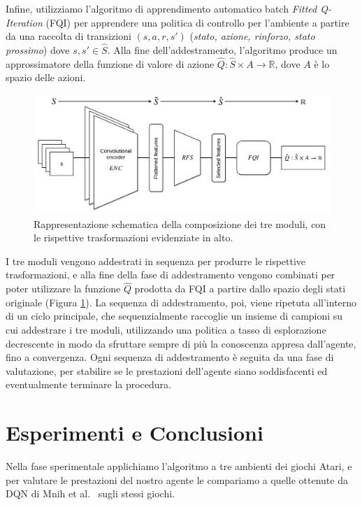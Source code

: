 Infine, utilizziamo l'algoritmo di apprendimento automatico batch 
\textit{Fitted Q-Iteration} (FQI) \cite{ernst2005tree} per apprendere una 
politica  di controllo per l'ambiente a partire da una raccolta di transizioni 
$(s, a, r, s')$ (\textit{stato, azione, rinforzo, stato prossimo}) dove 
$s, s' \in \hat{S}$. Alla fine dell'addestramento, l'algoritmo produce un 
approssimatore della funzione di valore di azione $\hat{Q}: \hat{S} \times A \rightarrow \mathbb{R}$, 
dove $A$ \`e lo spazio delle azioni. 
%
\begin{figure}
    \includegraphics[width=\textwidth]{pictures/full_pipeline}
    \centering
    \caption[Rappresentazione dei tre moduli principali]{Rappresentazione
	    schematica della composizione dei tre moduli, con le rispettive
	    trasformazioni evidenziate in alto.}
    \label{f:abs_full}
\end{figure}
%

I tre moduli vengono addestrati in sequenza per produrre le rispettive 
trasformazioni, e alla fine della fase di addestramento vengono combinati 
per poter utilizzare la funzione $\hat{Q}$ prodotta da FQI a partire dallo
spazio degli stati originale (Figura \ref{f:abs_full}).
La sequenza di addestramento, poi, viene ripetuta all'interno
di un ciclo principale, che sequenzialmente raccoglie un insieme di campioni
su cui addestrare i tre moduli, utilizzando una politica a tasso di esplorazione
decrescente in modo da sfruttare sempre di pi\`u la conoscenza appresa 
dall'agente, fino a convergenza. Ogni sequenza di addestramento \`e seguita
da una fase di valutazione, per stabilire se le prestazioni dell'agente siano
soddisfacenti ed eventualmente terminare la procedura. 

\section*{Esperimenti e Conclusioni}
Nella fase sperimentale applichiamo l'algoritmo a tre ambienti dei giochi Atari,
e per valutare le prestazioni del nostro agente le compariamo a quelle ottenute
da DQN di Mnih et al.\ \cite{mnih2015human} sugli stessi giochi.

